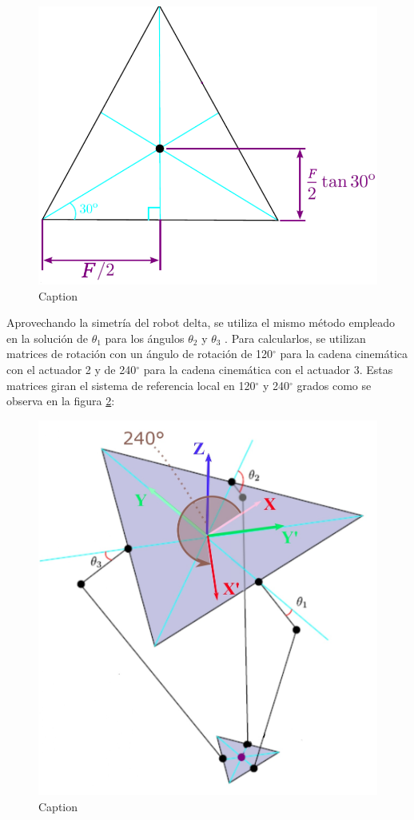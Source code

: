         \begin{figure}[htb]
            \centering
            \includegraphics[width=0.5\linewidth]{Main/Chapter4/Images4/DIBUJO15.PNG}
            \caption{Caption}
            \label{fig:ANEXO_MA_C_POS_9}
        \end{figure}
        
        \newpage
        
        Aprovechando la simetría del robot delta, se utiliza el mismo método empleado en la solución de  $\theta _{1}$  para los ángulos  $\theta _{2}$  y  $\theta _{3}$ . Para calcularlos, se utilizan matrices de rotación con un ángulo de rotación de 120$ ^{\circ} $  para la cadena cinemática con el actuador 2 y de 240$ ^{\circ} $  para la cadena cinemática con el actuador 3. Estas matrices giran el sistema de referencia local en 120$ ^{\circ} $  y 240$ ^{\circ} $  grados como se observa en la figura \ref{fig:ANEXO_MA_C_POS_10}:
        
        \begin{figure}[htb]
            \centering
            \includegraphics[width=0.9\linewidth]{Main/Chapter4/Images4/DIBUJO17.jpg}
            \caption{Caption}
            \label{fig:ANEXO_MA_C_POS_10}
        \end{figure}
     
